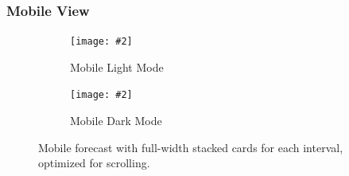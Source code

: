 \documentclass[fontsize=13pt,a4paper]{article}
\newcommand{\maxgraph}[2][]{%
  \texttt{[image: \#2]}%
}
\begin{document}
\subsubsection*{Mobile View}
\FloatBarrier
\begin{figure}[H]
  \centering
  \begin{subfigure}{0.48\linewidth}
    \maxgraph[width=\linewidth]{forecast_lightmode_mobile.jpg}
    \caption{Mobile Light Mode}
  \end{subfigure}\hfill
  \begin{subfigure}{0.48\linewidth}
    \maxgraph[width=\linewidth]{forecast_darkmode_mobile.jpg}
    \caption{Mobile Dark Mode}
  \end{subfigure}
  \caption{Mobile forecast with full-width stacked cards for each interval, optimized for scrolling.}
  \label{fig:forecast_mobile}
\end{figure}
\FloatBarrier
\end{document}
